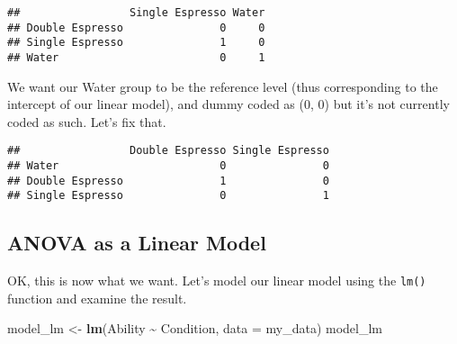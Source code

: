 \documentclass[
]{book}
\newenvironment{Shaded}{\begin{snugshade}}{\end{snugshade}}
\newcommand{\AttributeTok}[1]{\textcolor[rgb]{0.13,0.29,0.53}{#1}}
\newcommand{\FunctionTok}[1]{\textcolor[rgb]{0.13,0.29,0.53}{\textbf{#1}}}
\newcommand{\NormalTok}[1]{#1}
\newcommand{\OtherTok}[1]{\textcolor[rgb]{0.56,0.35,0.01}{#1}}
\newcommand{\SpecialCharTok}[1]{\textcolor[rgb]{0.81,0.36,0.00}{\textbf{#1}}}
\newcommand{\StringTok}[1]{\textcolor[rgb]{0.31,0.60,0.02}{#1}}
\begin{document}
\begin{verbatim}
##                 Single Espresso Water
## Double Espresso               0     0
## Single Espresso               1     0
## Water                         0     1
\end{verbatim}

We want our Water group to be the reference level (thus corresponding to the intercept of our linear model), and dummy coded as (0, 0) but it's not currently coded as such. Let's fix that.

\begin{Shaded}
\end{Shaded}

\begin{verbatim}
##                 Double Espresso Single Espresso
## Water                         0               0
## Double Espresso               1               0
## Single Espresso               0               1
\end{verbatim}

\hypertarget{anova-as-a-linear-model}{%
\subsection{ANOVA as a Linear Model}\label{anova-as-a-linear-model}}

OK, this is now what we want. Let's model our linear model using the \texttt{lm()} function and examine the result.

\begin{Shaded}
\begin{Highlighting}[]
\NormalTok{model\_lm }\OtherTok{\textless{}{-}} \FunctionTok{lm}\NormalTok{(Ability }\SpecialCharTok{\textasciitilde{}}\NormalTok{ Condition, }\AttributeTok{data =}\NormalTok{ my\_data)}
\NormalTok{model\_lm}
\end{Highlighting}
\end{Shaded}
\end{document}
